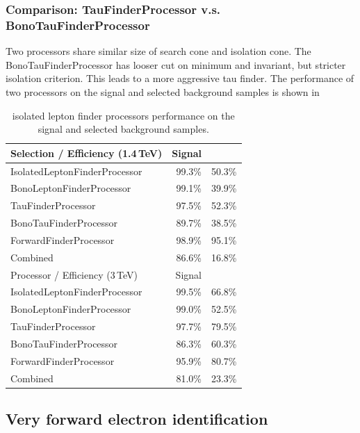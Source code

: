 \subsubsection{Comparison: TauFinderProcessor v.s. BonoTauFinderProcessor}

Two processors share similar size of search cone and isolation cone. The BonoTauFinderProcessor has looser cut on minimum \pT and invariant, but stricter isolation criterion. This leads to a more aggressive tau finder. The performance of two processors on the signal and selected background samples is shown in 

\begin{table}[!tbp]
\begin{tabular}{lrr}
\hline
\hline
Selection / Efficiency (1.4\,TeV)  &  Signal & \HepProcess{\Pquark\Pquark\Pquark\Pquark\Plepton\Pnu} \\
\hline
IsolatedLeptonFinderProcessor & 99.3\% & 50.3\%  \\
BonoLeptonFinderProcessor & 99.1\% & 39.9\%  \\
TauFinderProcessor & 97.5\% & 52.3\%  \\
BonoTauFinderProcessor & 89.7\% & 38.5\%  \\
ForwardFinderProcessor & 98.9\% & 95.1\%  \\
Combined & 86.6\% & 16.8\%  \\
\hline
Processor / Efficiency (3\,TeV)  &  Signal  & \HepProcess{\Pquark\Pquark\Pquark\Pquark\Plepton\Pnu} \\
\hline
IsolatedLeptonFinderProcessor & 99.5\% & 66.8\%  \\
BonoLeptonFinderProcessor & 99.0\% & 52.5\%  \\
TauFinderProcessor & 97.7\% & 79.5\%  \\
BonoTauFinderProcessor & 86.3\% & 60.3\%  \\
ForwardFinderProcessor & 95.9\% & 80.7\%  \\
Combined & 81.0\% & 23.3\%  \\
\hline
\hline

\end{tabular}
\caption{isolated lepton finder processors performance on the signal and selected background samples.}
\label{tab:doubleHiggsIsoLepPerformance}
\end{table}

\subsection{Very forward electron identification}

